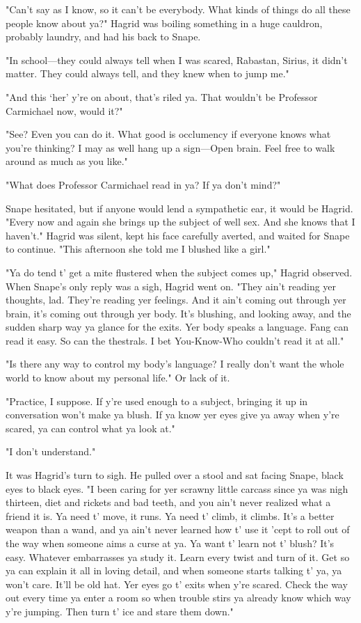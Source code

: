 "Can't say as I know, so it can't be everybody. What kinds of things do all these people know about ya?" Hagrid was boiling something in a huge cauldron, probably laundry, and had his back to Snape.

"In school—they could always tell when I was scared, Rabastan, Sirius, it didn't matter. They could always tell, and they knew when to jump me."

"And this `her' y're on about, that's riled ya. That wouldn't be Professor Carmichael now, would it?"

"See? Even you can do it. What good is occlumency if everyone knows what you're thinking? I may as well hang up a sign—Open brain. Feel free to walk around as much as you like."

"What does Professor Carmichael read in ya? If ya don't mind?"

Snape hesitated, but if anyone would lend a sympathetic ear, it would be Hagrid. "Every now and again she brings up the subject of{\el} well{\el} sex. And she knows that I{\el} haven't." Hagrid was silent, kept his face carefully averted, and waited for Snape to continue. "This afternoon she told me I blushed like a girl."

"Ya do tend t' get a mite flustered when the subject comes up," Hagrid observed. When Snape's only reply was a sigh, Hagrid went on. "They ain't reading yer thoughts, lad. They're reading yer feelings. And it ain't coming out through yer brain, it's coming out through yer body. It's blushing, and looking away, and the sudden sharp way ya glance for the exits. Yer body speaks a language. Fang can read it easy. So can the thestrals. I bet You-Know-Who couldn't read it at all."

"Is there any way to control my body's language? I really don't want the whole world to know about my personal life." Or lack of it.

"Practice, I suppose. If y're used enough to a subject, bringing it up in conversation won't make ya blush. If ya know yer eyes give ya away when y're scared, ya can control what ya look at."

"I don't understand."

It was Hagrid's turn to sigh. He pulled over a stool and sat facing Snape, black eyes to black eyes. "I been caring for yer scrawny little carcass since ya was nigh thirteen, diet and rickets and bad teeth, and you ain't never realized what a friend it is. Ya need t' move, it runs. Ya need t' climb, it climbs. It's a better weapon than a wand, and ya ain't never learned how t' use it 'cept to roll out of the way when someone aims a curse at ya. Ya want t' learn not t' blush? It's easy. Whatever embarrasses ya{\el} study it. Learn every twist and turn of it. Get so ya can explain it all in loving detail, and when someone starts talking t' ya, ya won't care. It'll be old hat. Yer eyes go t' exits when y're scared. Check the way out every time ya enter a room so when trouble stirs ya already know which way y're jumping. Then turn t' ice and stare them down."

